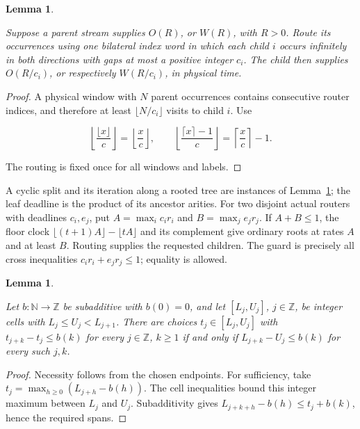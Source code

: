 \documentclass[11pt,a4paper]{article}
\newtheorem{lemma}[theorem]{Lemma}
\begin{document}
\begin{lemma}\label{stmt:A.2}

 Suppose a parent stream supplies \(O(R)\), or \(W(R)\), with \(R>0\). Route its occurrences using one bilateral index word in which each child \(i\) occurs infinitely in both directions with gaps at most a positive integer \(c_i\). The child then supplies \(O(R/c_i)\), or respectively \(W(R/c_i)\), in physical time.

\end{lemma}

\begin{proof}

 A physical window with \(N\) parent occurrences contains consecutive router indices, and therefore at least \(\lfloor N/c_i\rfloor\) visits to child \(i\). Use

\[
 \left\lfloor\frac{\lfloor x\rfloor}{c}\right\rfloor
 =\left\lfloor\frac{x}{c}\right\rfloor,\qquad
 \left\lfloor\frac{\lceil x\rceil-1}{c}\right\rfloor
 =\left\lceil\frac{x}{c}\right\rceil-1.
\]

The routing is fixed once for all windows and labels. 

\end{proof}

A cyclic split and its iteration along a rooted tree are instances of Lemma~\ref{stmt:A.2}; the leaf deadline is the product of its ancestor arities. For two disjoint actual routers with deadlines \(c_i,e_j\), put \(A=\max_i c_i r_i\) and \(B=\max_j e_jr_j\). If \(A+B\le1\), the floor clock \(\lfloor(t+1)A\rfloor-\lfloor tA\rfloor\) and its complement give ordinary roots at rates \(A\) and at least \(B\). Routing supplies the requested children. The guard is precisely all cross inequalities \(c_i r_i+e_jr_j\le1\); equality is allowed.

\begin{lemma}\label{stmt:A.3}

 Let \(b:\mathbb N\to\mathbb Z\) be subadditive with \(b(0)=0\), and let \([L_j,U_j]\), \(j\in\mathbb Z\), be integer cells with \(L_j\le U_j<L_{j+1}\). There are choices \(t_j\in[L_j,U_j]\) with \(t_{j+k}-t_j\le b(k)\) for every \(j\in\mathbb Z\), \(k\ge1\) if and only if \(L_{j+k}-U_j\le b(k)\) for every such \(j,k\).

\end{lemma}

\begin{proof}

 Necessity follows from the chosen endpoints. For sufficiency, take \(t_j=\max_{h\ge0}(L_{j+h}-b(h))\). The cell inequalities bound this integer maximum between \(L_j\) and \(U_j\). Subadditivity gives \(L_{j+k+h}-b(h)\le t_j+b(k)\), hence the required spans. 

\end{proof}
\end{document}
